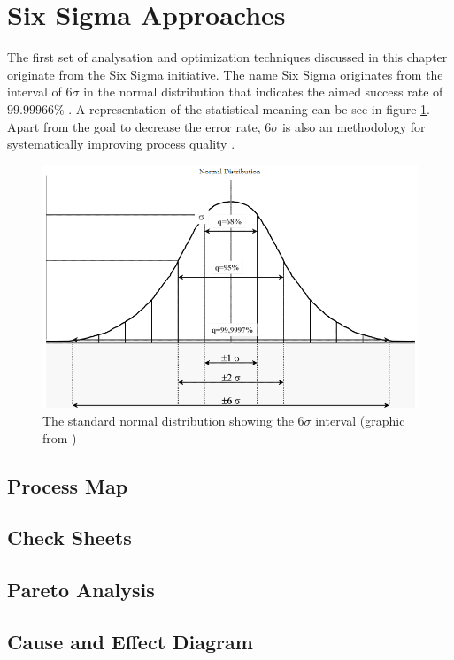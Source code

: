 \section{Six Sigma Approaches}
The first set of analysation and optimization techniques discussed in this chapter originate from the Six Sigma initiative. The name Six Sigma originates from the interval of $6\sigma$ in the normal distribution that indicates the aimed success rate of $99.99966\%$ \cite{siha2008business}\cite{vivekananthamoorthy2011lean} . A representation of the statistical meaning can be see in figure \ref{fig:six-sigma}. Apart from the goal to decrease the error rate, $6\sigma$ is also an methodology for systematically improving process quality \cite{tennant2017six}.

\begin{figure}[H]
		\centering
		\includegraphics[width=0.9\columnwidth]{graphics/six-sigma}
		\caption{The standard normal distribution showing the $6\sigma$ interval (graphic from \cite{vivekananthamoorthy2011lean})} 
		\label{fig:six-sigma} 
\end{figure}



\subsection{Process Map}
\subsection{Check Sheets}
\subsection{Pareto Analysis}
\subsection{Cause and Effect Diagram}

